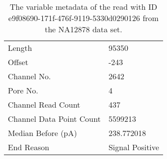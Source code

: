 \begin{table}
    \caption{\label{tab:data-read-meta}The variable metadata of the read with ID e9f08690-171f-476f-9119-5330d0290126 from the NA12878 data set.}
    \begin{tabular}{|l|l|}%
        \hline
	Length & 95350\\ %
	Offset & -243\\
	Channel No. & 2642\\ %
	Pore No. & 4\\ %
	Channel Read Count & 437\\ %
	Channel Data Point Count& 5599213\\ %
    Median Before (pA) & 238.772018\\ %
	    End Reason & Signal Positive \\
	\hline
    \end{tabular}
\end{table}
